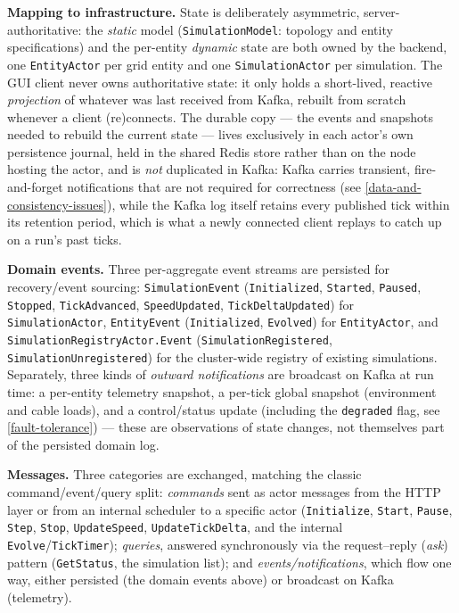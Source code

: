 \documentclass{scrreprt}
\begin{document}
\textbf{Mapping to infrastructure.} State is deliberately asymmetric, server-authoritative:
the \emph{static} model (\texttt{SimulationModel}: topology and entity specifications) and the
per-entity \emph{dynamic} state are both owned by the backend, one \texttt{EntityActor} per
grid entity and one \texttt{SimulationActor} per simulation. The GUI client never owns authoritative state: it only
holds a short-lived, reactive \emph{projection} of whatever was last received from Kafka,
rebuilt from scratch whenever a client (re)connects. The durable copy --- the events and
snapshots needed to rebuild the current state --- lives exclusively in each actor's own persistence journal, held in the shared Redis
store rather than on the node hosting the actor, and is \emph{not}
duplicated in Kafka: Kafka carries transient, fire-and-forget notifications that are not
required for correctness (see \cref{data-and-consistency-issues}), while the Kafka log itself
retains every published tick within its retention period, which is what a newly connected
client replays to catch up on a run's past ticks.

\textbf{Domain events.} Three per-aggregate event streams are persisted for recovery/event
sourcing: \texttt{SimulationEvent} (\texttt{Initialized}, \texttt{Started}, \texttt{Paused},
\texttt{Stopped}, \texttt{TickAdvanced}, \texttt{SpeedUpdated}, \texttt{TickDeltaUpdated}) for
\texttt{SimulationActor}, \texttt{EntityEvent} (\texttt{Initialized}, \texttt{Evolved}) for
\texttt{EntityActor}, and \texttt{SimulationRegistryActor.Event}
(\texttt{SimulationRegistered}, \texttt{SimulationUnregistered}) for the cluster-wide registry
of existing simulations. Separately, three kinds of \emph{outward notifications} are broadcast on
Kafka at run time: a per-entity telemetry snapshot, a per-tick global snapshot (environment and
cable loads), and a control/status update (including the \texttt{degraded} flag, see
\cref{fault-tolerance}) --- these are observations of state changes, not themselves part of the
persisted domain log.

\textbf{Messages.} Three categories are exchanged, matching the classic command/event/query
split: \emph{commands} sent as actor messages from the HTTP layer or from an internal scheduler
to a specific actor (\texttt{Initialize}, \texttt{Start}, \texttt{Pause}, \texttt{Step},
\texttt{Stop}, \texttt{UpdateSpeed}, \texttt{UpdateTickDelta}, and the internal
\texttt{Evolve}/\texttt{TickTimer}); \emph{queries}, answered synchronously via the
request--reply (\emph{ask}) pattern (\texttt{GetStatus}, the simulation list); and
\emph{events/notifications}, which flow one way, either persisted (the domain events above) or
broadcast on Kafka (telemetry).
\end{document}
